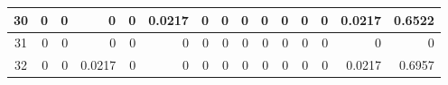 \begin{table}[hb!]
\begin{adjustbox}{width = \textwidth, center}
\begin{tabular}{|c|r|r|r|r|r|r|r|r|r|r|r|r|r|r|}
        \rowcolor[HTML]{FFFFFF} 
        \cellcolor[HTML]{CFE2F3}30                                  & 0                                              & 0                                              & 0                                              & 0                                              & \cellcolor[HTML]{C7E9D8}0.0217                 & 0                                              & 0                                              & 0                                               & 0                                               & 0                                               & 0                                               & 0                                               & \cellcolor[HTML]{D9D2E9}0.0217                                                  & \cellcolor[HTML]{D9D2E9}0.6522                                                        \\ \hline
        \rowcolor[HTML]{FFFFFF} 
        \cellcolor[HTML]{CFE2F3}31                                  & 0                                              & 0                                              & 0                                              & 0                                              & 0                                              & 0                                              & 0                                              & 0                                               & 0                                               & 0                                               & 0                                               & 0                                               & \cellcolor[HTML]{D9D2E9}0                                                       & \cellcolor[HTML]{D9D2E9}0                                                             \\ \hline
        \rowcolor[HTML]{FFFFFF} 
        \cellcolor[HTML]{CFE2F3}32                                  & 0                                              & 0                                              & \cellcolor[HTML]{C7E9D8}0.0217                 & 0                                              & 0                                              & 0                                              & 0                                              & 0                                               & 0                                               & 0                                               & 0                                               & 0                                               & \cellcolor[HTML]{D9D2E9}0.0217                                                  & \cellcolor[HTML]{D9D2E9}0.6957                                                        \\ \hline

\end{tabular}
\end{adjustbox}
\end{table}

